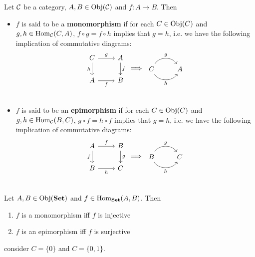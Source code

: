 \documentclass{book}
\begin{document}
	\begin{defn} 
		Let $\mathcal{C}$ be a category, $A,B \in \operatorname{Obj}(\mathcal{C})$ and $f:A \rightarrow B$. Then 
		\begin{itemize}
			\item 
			$f$ is said to be a \textbf{monomorphism} if for each $C \in \operatorname{Obj}(C)$ and $g,h \in \operatorname{Hom}_{\mathcal{C}}(C, A)$, $f \circ g = f \circ h$ implies that $g = h$, i.e. we have the following implication of commutative diagrams: 
			\[ 
			\begin{tikzcd}[baseline= 7]
				C \arrow[r, "g"] \arrow[d, "h"'] & A \arrow[d, "f"] \\
				A \arrow[r, "f"'] & B\\
			\end{tikzcd}
			\implies
			\begin{tikzcd}[baseline= 7]
				C \arrow[bend right=60, swap]{r}{h} \arrow[bend right=-60]{r}{g} & A  \\
			\end{tikzcd}
			\]
			\item 
			$f$ is said to be an \textbf{epimorphism} if for each $C \in \operatorname{Obj}(C)$ and $g,h \in \operatorname{Hom}_{\mathcal{C}}(B, C)$, $g \circ f = h \circ f$ implies that $g = h$, i.e. we have the following implication of commutative diagrams: \\
			\[ 
			\begin{tikzcd}[baseline= 7]
				A \arrow[r, "f"] \arrow[d, "f"'] & B \arrow[d, "g"] \\
				B \arrow[r, "h"'] & C\\
			\end{tikzcd}
			\implies
			\begin{tikzcd}[baseline= 7]
				B \arrow[bend right=60, swap]{r}{h} \arrow[bend right=-60]{r}{g} & C  \\
			\end{tikzcd}
			\]
		\end{itemize}
	\end{defn}
	
	\begin{ex} 
		Let $A, B \in \operatorname{Obj}(\operatorname*{\text{\textbf{Set}}})$ and $f \in \operatorname{Hom}_{\operatorname*{\text{\textbf{Set}}}}(A,B)$. Then 
		\begin{enumerate}
			\item $f$ is a monomorphism iff $f$ is injective
			\item $f$ is an epimorphism iff $f$ is surjective 
		\end{enumerate} 
		 consider $C = \{0\}$ and $C = \{0,1\}$.
	\end{ex}
	
\end{document}
